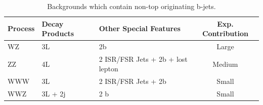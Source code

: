 	\begin{table}[hbt]
	\caption{\label{tab:bjet_bkg} Backgrounds which contain non-top originating b-jets.}
	\begin{center}
	\begin{tabular}{l|ll|c}\hline\hline %
	Process & Decay Products & Other Special Features & Exp. Contribution\\
	\hline
	WZ & 3L & 2b  & Large\\
	ZZ & 4L & 2 ISR/FSR Jets + 2b + lost lepton & Medium\\
	WWW & 3L & 2 ISR/FSR Jets + 2b& Small\\
	WWZ & 3L + 2j & 2 b & Small\\
	\hline \hline
	\end{tabular}
	
	\end{center}
	\end{table}



		

			  
		
			
			
			
			
			